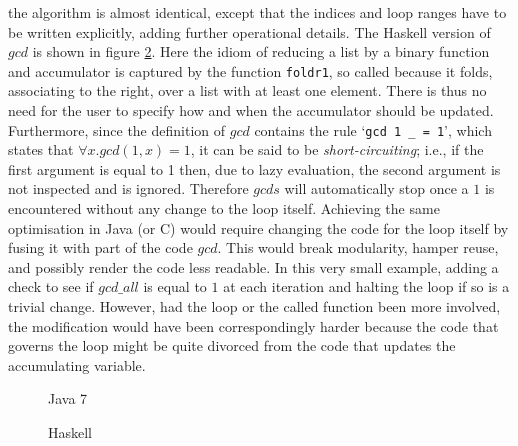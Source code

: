 the algorithm is almost identical, except that the indices and loop ranges have to be written explicitly, adding further
operational details.
The Haskell version of $gcd$ is shown in figure \ref{fig:gcds:haskell}. Here the idiom
of reducing a list by a binary function and accumulator is captured
by the function \lstinline|foldr1|, so called because it folds,
associating to the right, over a list with at least one element. There is thus no 
need for the user to specify how and when the accumulator should be updated.
Furthermore, since the definition of $gcd$ contains the rule
`\lstinline|gcd 1 _ = 1|',
which states that $\forall x. gcd (1, x) = 1$, it can be said to be
\emph{short-circuiting}; i.e., if the first argument is equal to 1 then, due
to lazy evaluation, the second argument is not inspected and is ignored.
Therefore $gcds$ will automatically stop once a $1$ is encountered without any
change to the loop itself. Achieving the same optimisation in Java (or C) would
require changing the code for the loop itself by fusing it with part of the code $gcd$. This would break
modularity, hamper reuse, and possibly render the code less readable.
In this very small example, adding a check to see if $gcd\_all$ is equal to $1$ at each 
iteration and halting the loop if so is a trivial change. However, had the loop or the called function been more involved, the modification would have been correspondingly harder because the code that governs the loop might be
quite divorced from the code that updates the accumulating variable.

\begin{figure}

\caption{Java 7}
\label{fig:gcds:java}
\end{figure}

%

\begin{figure}

\caption{Haskell}
\label{fig:gcds:haskell}
\end{figure}
